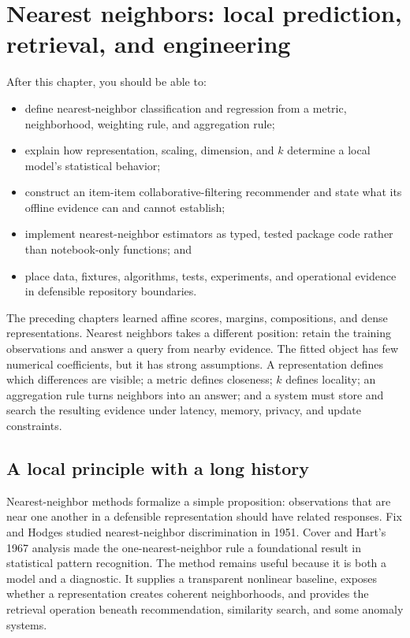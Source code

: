 \chapter{Nearest neighbors: local prediction, retrieval, and engineering}
\label{ch:nearest-neighbors}

\begin{learningobjectives}
After this chapter, you should be able to:
\begin{itemize}
  \item define nearest-neighbor classification and regression from a metric,
  neighborhood, weighting rule, and aggregation rule;
  \item explain how representation, scaling, dimension, and $k$ determine a
  local model's statistical behavior;
  \item construct an item-item collaborative-filtering recommender and state
  what its offline evidence can and cannot establish;
  \item implement nearest-neighbor estimators as typed, tested package code
  rather than notebook-only functions; and
  \item place data, fixtures, algorithms, tests, experiments, and operational
  evidence in defensible repository boundaries.
\end{itemize}
\end{learningobjectives}

\begin{chapterconnection}
The preceding chapters learned affine scores, margins, compositions, and dense
representations. Nearest neighbors takes a different position: retain the
training observations and answer a query from nearby evidence. The fitted
object has few numerical coefficients, but it has strong assumptions. A
representation defines which differences are visible; a metric defines
closeness; $k$ defines locality; an aggregation rule turns neighbors into an
answer; and a system must store and search the resulting evidence under latency,
memory, privacy, and update constraints.
\end{chapterconnection}

\section{A local principle with a long history}

Nearest-neighbor methods formalize a simple proposition: observations that are
near one another in a defensible representation should have related responses.
Fix and Hodges studied nearest-neighbor discrimination in 1951. Cover and Hart's
1967 analysis made the one-nearest-neighbor rule a foundational result in
statistical pattern recognition. The method remains useful because it is both a
model and a diagnostic. It supplies a transparent nonlinear baseline, exposes
whether a representation creates coherent neighborhoods, and provides the
retrieval operation beneath recommendation, similarity search, and some anomaly
systems.

